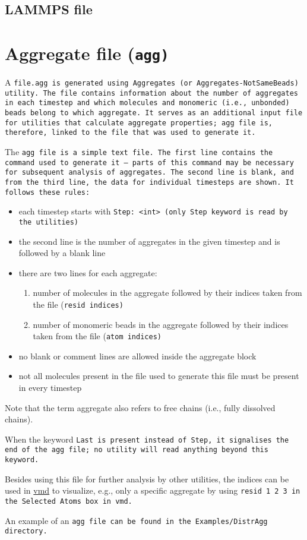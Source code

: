 \subsection{LAMMPS \data file} %

\section{Aggregate file (\tt{agg})} \label{ssec:AggFile} %

A \tt{file.agg} is generated using
\tt{Aggregates} (or \tt{Aggregates-NotSameBeads}) utility. The
file contains information about the number of aggregates in each timestep
and which molecules and monomeric (i.e., unbonded) beads belong to which
aggregate. It serves as an additional input file for utilities that
calculate aggregate properties; \tt{agg} file is, therefore, linked to
the \vcf file that was used to generate it.

The \tt{agg} file is a simple text file. The first line contains the
command used to generate it -- parts of this command may be necessary for
subsequent analysis of aggregates. The second line is blank, and from the
third line, the data for individual timesteps are shown. It follows these
rules:

\begin{itemize}[topsep=0pt,itemsep=0pt]
  \item each timestep starts with \tt{Step: <int>} (only \tt{Step}
    keyword is read by the utilities)
  \item the second line is the number of aggregates in the given
    timestep and is followed by a blank line
  \item there are two lines for each aggregate:
  \begin{enumerate}[topsep=0pt,itemsep=0pt]
    \item number of molecules in the aggregate followed by their indices
      taken from the \vsf file (\tt{resid} indices)
    \item number of monomeric beads in the aggregate followed by their
      indices taken from the \vsf file (\tt{atom} indices)
  \end{enumerate}
  \item no blank or comment lines are allowed inside the aggregate block
  \item not all molecules present in the \vcf file used to generate
    this file must be present in every timestep
\end{itemize}

Note that the term aggregate also refers to free chains (i.e., fully
dissolved chains).

When the keyword \tt{Last} is present instead of \tt{Step}, it
signalises the end of the \tt{agg} file; no utility will read anything
beyond this keyword.

Besides using this file for further analysis by other utilities, the
indices can be used in \href{http://www.ks.uiuc.edu/Research/vmd/}{vmd} to
visualize, e.g., only a specific aggregate by using \tt{resid 1 2 3} in the
\tt{Selected Atoms} box in vmd.

An example of an \tt{agg} file can be found in the \tt{Examples/DistrAgg}
directory. %
